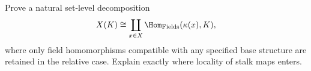 \begin{problem}\label{chal:vi21-c01}
Prove a natural set-level decomposition
\[
X(K)\cong\coprod_{x\in X}\Hom_{\mathrm{Fields}}(\kappa(x),K),
\]
where only field homomorphisms compatible with any specified base structure are retained in the relative case.  Explain exactly where locality of stalk maps enters.
\end{problem}
